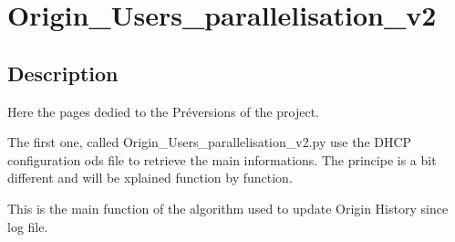 \documentclass[letterpaper,10pt,english]{sphinxmanual}
\begin{document}
\sphinxstepscope


\chapter{Origin\_Users\_parallelisation\_v2}
\label{\detokenize{Origin_Users_parallelisation_v2:origin-users-parallelisation-v2}}\label{\detokenize{Origin_Users_parallelisation_v2::doc}}
\newpage
\section{Description}
\label{\detokenize{Origin_Users_parallelisation_v2:description}}
\sphinxAtStartPar
Here the pages dedied to the Pré\sphinxhyphen{}versions of the project.

\sphinxAtStartPar
The first one, called Origin\_Users\_parallelisation\_v2.py use the DHCP configuration ods file to retrieve the main informations.
The principe is a bit different and will be xplained function by function.

\sphinxAtStartPar
This is the main function of the algorithm used to update Origin History since log file.
\end{document}
